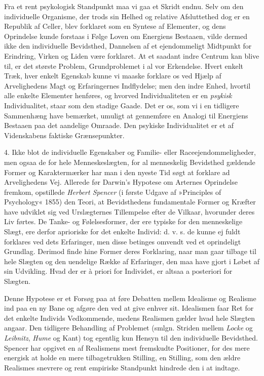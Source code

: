 \documentclass[12pt,a4paper,openany]{book}
\newcommand{\opage}[1]{\marginnote{\footnotesize\textit{[#1]}}}
\begin{document}
Fra et rent psykologisk Standpunkt maa vi gaa et Skridt endnu. Selv om
den individuelle Organisme, der trods sin Helhed og relative
Afsluttethed dog er en Republik af Celler, blev forklaret som en Syntese
af Elementer, og dens Oprindelse kunde forstaas i Følge Loven om
Energiens Bestaaen, vilde dermed ikke den individuelle Bevidsthed,
Dannelsen af et ejendommeligt Midtpunkt for Erindring, Virken og Liden
være forklaret. At et saadant indre Centrum kan blive til, er det
største Problem, Grundproblemet i al vor Erkendelse. Hvert enkelt Træk,
hver enkelt Egenskab kunne vi maaske forklare os ved Hjælp af
Arvelighedens Magt og Erfaringernes Indflydelse; men den indre Enhed,
hvortil alle enkelte Elementer henføres, og hvorved Individualiteten er
en \emph{psykisk} Individualitet, staar som den stadige Gaade. Det er
os, som vi i en tidligere Sammenhæng have bemærket, umuligt at
gennemføre en Analogi til Energiens Bestaaen paa det aandelige Omraade.
Den psykiske Individualitet er et af Videnskabens faktiske
Grænsepunkter.

4. Ikke blot de individuelle Egenskaber og Familie- eller
Raceejendommeligheder, men ogsaa de for hele Menneskeslægten, for al
menneskelig Bevidsthed gældende Former og Karaktermærker har man i den
nyeste Tid søgt at forklare ad Arvelighedens Vej. Allerede før Darwin’s
Hypotese om Arternes Oprindelse fremkom, opstillede \emph{Herbert
Spencer} (i første Udgave af »Principles of Psychology« 1855) den Teori,
at Bevidsthedens fundamentale Former og Kræfter have udviklet sig ved
Urslægternes Tillempelse efter de Vilkaar, hvorunder deres Liv førtes.
De Tanke- og Følelsesformer, der ere typiske for den menneskelige Slægt,
ere derfor aprioriske for det enkelte Individ: d. v. s. de kunne ej
fuldt forklares
\opage{411}ved dets Erfaringer, men disse betinges omvendt ved et
oprindeligt Grundlag. Derimod finde hine Former deres Forklaring, naar
man gaar tilbage til hele Slægten og den uendelige Række af Erfaringer,
den maa have gjort i Løbet af sin Udvikling. Hvad der er à priori for
Individet, er altsaa a posteriori for Slægten.

Denne Hypotese er et Forsøg paa at føre Debatten mellem Idealisme og
Realisme ind paa en ny Bane og afgøre den ved at give enhver sit.
Idealismen faar Ret for det enkelte Individs Vedkommende, medens
Realismen gælder hvad hele Slægten angaar. Den tidligere Behandling af
Problemet (smlgn. Striden mellem \emph{Locke} og \emph{Leibnitz},
\emph{Hume} og Kant) tog egentlig kun Hensyn til den individuelle
Bevidsthed. Spencer har opgivet en af Realismens mest fremskudte
Positioner, for des mere energisk at holde en mere tilbagetrukken
Stilling, en Stilling, som den ældre Realismes snevrere og rent
empiriske Standpunkt hindrede den i at indtage.
\end{document}
